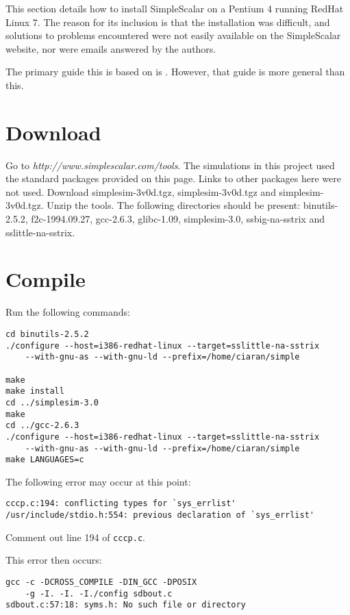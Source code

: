 \label{SimpleScalar Install}


This section details how to install SimpleScalar on a Pentium 4 running RedHat
Linux 7. The reason for its inclusion is that the installation was difficult,
and solutions to problems encountered were not easily available on the
SimpleScalar website, nor were emails answered by the authors.

The primary guide this is based on is \cite{SimpleScalarInstall}. However, that
guide is more general than this.

\section{Download}
Go to \textit{http://www.simplescalar.com/tools}. The simulations in this
project used the standard packages provided on this page. Links to other
packages here were not used. Download simplesim-3v0d.tgz, simplesim-3v0d.tgz
and simplesim-3v0d.tgz. Unzip the tools. The following directories should be
present: binutils-2.5.2,  f2c-1994.09.27,  gcc-2.6.3,  glibc-1.09,
simplesim-3.0, ssbig-na-sstrix and sslittle-na-sstrix.

\section{Compile}
Run the following commands:
\begin{verbatim}
cd binutils-2.5.2
./configure --host=i386-redhat-linux --target=sslittle-na-sstrix 
	--with-gnu-as --with-gnu-ld --prefix=/home/ciaran/simple

make
make install
cd ../simplesim-3.0
make
cd ../gcc-2.6.3
./configure --host=i386-redhat-linux --target=sslittle-na-sstrix 
	--with-gnu-as --with-gnu-ld --prefix=/home/ciaran/simple
make LANGUAGES=c
\end{verbatim}

The following error may occur at this point:
\begin{verbatim}
cccp.c:194: conflicting types for `sys_errlist'
/usr/include/stdio.h:554: previous declaration of `sys_errlist'
\end{verbatim}

Comment out line 194 of \texttt{cccp.c}.

This error then occurs:
\begin{verbatim}
gcc -c -DCROSS_COMPILE -DIN_GCC -DPOSIX 
	-g -I. -I. -I./config sdbout.c
sdbout.c:57:18: syms.h: No such file or directory
\end{verbatim}

